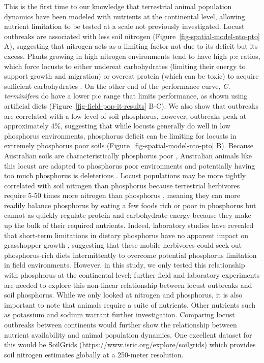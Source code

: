 \documentclass[
]{article}
\begin{document}
This is the first time to our knowledge that terrestrial animal
population dynamics have been modeled with nutrients at the continental
level, allowing nutrient limitation to be tested at a scale not
previously investigated. Locust outbreaks are associated with less soil
nitrogen (Figure~\ref{fig-spatial-model-nto-pto} A), suggesting that
nitrogen acts as a limiting factor not due to its deficit
\citep{white_inadequate_1993} but its excess. Plants growing in high
nitrogen environments tend to have high p:c ratios, which force locusts
to either undereat carbohydrates (limiting their energy to support
growth and migration) or overeat protein (which can be toxic) to acquire
sufficient carbohydrates \citep{behmer_insect_2009, cease_how_2024}. On
the other end of the performance curve, \emph{C. terminifera} do have a
lower p:c range that limits performance, as shown using artificial diets
(Figure~\ref{fig-field-pop-it-results} B-C). We also show that outbreaks
are correlated with a low level of soil phosphorus, however, outbreaks
peak at approximately 4\%, suggesting that while locusts generally do
well in low phosphorus environments, phosphorus deficit can be limiting
for locusts in extremely phosphorus poor soils
(Figure~\ref{fig-spatial-model-nto-pto} B). Because Australian soils are
characteristically phosphorus poor \citep{donald_colin_phosphorus_1964},
Australian animals like this locust are adapted to phosphorus poor
environments and potentially having too much phosphorus is deleterious
\citep{morton_fresh_2011}. Locust populations may be more tightly
correlated with soil nitrogen than phosphorus because terrestrial
herbivores require 5-50 times more nitrogen than phosphorus
\citep{elser_nutritional_2000}, meaning they can more readily balance
phosphorus by eating a few foods rich or poor in phosphorus but cannot
as quickly regulate protein and carbohydrate energy because they make up
the bulk of their required nutrients. Indeed, laboratory studies have
revealed that short-term limitations in dietary phosphorus have no
apparent impact on grasshopper growth \citep{cease_dietary_2016},
suggesting that these mobile herbivores could seek out phosphorus-rich
diets intermittently to overcome potential phosphorus limitation in
field environments. However, in this study, we only tested this
relationship with phosphorus at the continental level; further field and
laboratory experiments are needed to explore this non-linear
relationship between locust outbreaks and soil phosphorus. While we only
looked at nitrogen and phosphorus, it is also important to note that
animals require a suite of nutrients. Other nutrients such as potassium
and sodium \citep{joern_not_2012} warrant further investigation.
Comparing locust outbreaks between continents would further show the
relationship between nutrient availability and animal population
dynamics. One excellent dataset for this would be SoilGrids
(https://www.isric.org/explore/soilgrids) which provides soil nitrogen
estimates globally at a 250-meter resolution.
\end{document}
